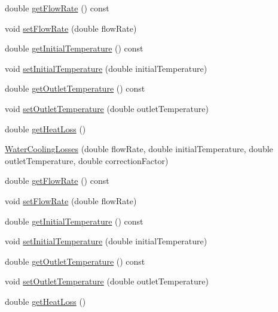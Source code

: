 \begin{DoxyCompactItemize}
\item 
double \hyperlink{class_water_cooling_losses_a47f1b7d46f0e34ae898150a7c69e5f18}{get\+Flow\+Rate} () const
\item 
void \hyperlink{class_water_cooling_losses_abf4d64d9261818af331613791374d42f}{set\+Flow\+Rate} (double flow\+Rate)
\item 
double \hyperlink{class_water_cooling_losses_a205b469029ec9cd4d792169bf8589f24}{get\+Initial\+Temperature} () const
\item 
void \hyperlink{class_water_cooling_losses_a56b0b64b71ecbece780622d5f4b536ba}{set\+Initial\+Temperature} (double initial\+Temperature)
\item 
double \hyperlink{class_water_cooling_losses_a79fb78755e813b2a3aa36ccd8ccebf7a}{get\+Outlet\+Temperature} () const
\item 
void \hyperlink{class_water_cooling_losses_a36bb100df0580a78f63f266cdc1d41f5}{set\+Outlet\+Temperature} (double outlet\+Temperature)
\item 
double \hyperlink{class_water_cooling_losses_a8f884cc70d7af7add5bb1be7f837384c}{get\+Heat\+Loss} ()
\item 
\hyperlink{class_water_cooling_losses_ac95601d8c56e7243ffa3e022819a112f}{Water\+Cooling\+Losses} (double flow\+Rate, double initial\+Temperature, double outlet\+Temperature, double correction\+Factor)
\item 
double \hyperlink{class_water_cooling_losses_a47f1b7d46f0e34ae898150a7c69e5f18}{get\+Flow\+Rate} () const
\item 
void \hyperlink{class_water_cooling_losses_abf4d64d9261818af331613791374d42f}{set\+Flow\+Rate} (double flow\+Rate)
\item 
double \hyperlink{class_water_cooling_losses_a205b469029ec9cd4d792169bf8589f24}{get\+Initial\+Temperature} () const
\item 
void \hyperlink{class_water_cooling_losses_a56b0b64b71ecbece780622d5f4b536ba}{set\+Initial\+Temperature} (double initial\+Temperature)
\item 
double \hyperlink{class_water_cooling_losses_a79fb78755e813b2a3aa36ccd8ccebf7a}{get\+Outlet\+Temperature} () const
\item 
void \hyperlink{class_water_cooling_losses_a36bb100df0580a78f63f266cdc1d41f5}{set\+Outlet\+Temperature} (double outlet\+Temperature)
\item 
double \hyperlink{class_water_cooling_losses_a8f884cc70d7af7add5bb1be7f837384c}{get\+Heat\+Loss} ()
\end{DoxyCompactItemize}


